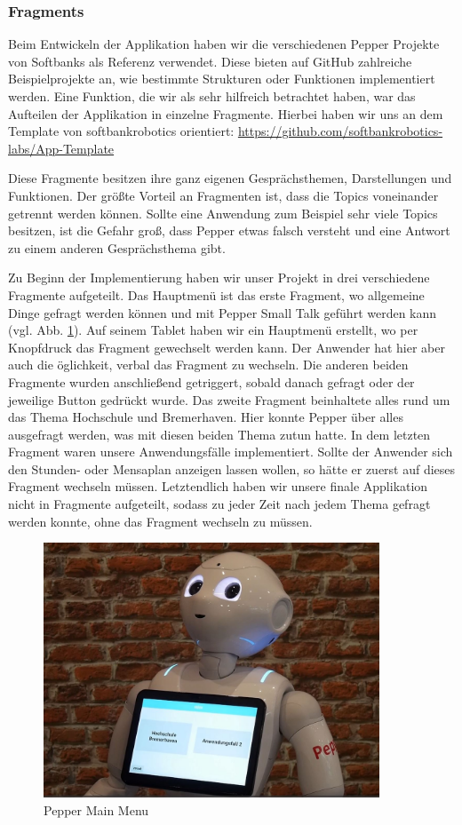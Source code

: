 \subsubsection{Fragments}

Beim Entwickeln der Applikation haben wir die verschiedenen Pepper Projekte von Softbanks als Referenz verwendet. Diese bieten auf GitHub zahlreiche Beispielprojekte an, wie bestimmte Strukturen oder Funktionen implementiert werden. Eine Funktion, die wir als sehr hilfreich betrachtet haben, war das Aufteilen der Applikation in einzelne Fragmente. Hierbei haben wir uns an dem Template von softbankrobotics orientiert: \url{https://github.com/softbankrobotics-labs/App-Template}

Diese Fragmente besitzen ihre ganz eigenen Gesprächsthemen, Darstellungen und Funktionen. Der größte Vorteil an Fragmenten ist, dass die Topics voneinander getrennt werden können. Sollte eine Anwendung zum Beispiel sehr viele Topics besitzen, ist die Gefahr groß, dass Pepper etwas falsch versteht und eine Antwort zu einem anderen Gesprächsthema gibt.

Zu Beginn der Implementierung haben wir unser Projekt in drei verschiedene Fragmente aufgeteilt. Das Hauptmenü ist das erste Fragment, wo allgemeine Dinge gefragt werden können und mit Pepper Small Talk geführt werden kann (vgl. Abb. \ref{fig:Mainmenu}). Auf seinem Tablet haben wir ein Hauptmenü erstellt, wo per Knopfdruck das Fragment gewechselt werden kann. Der Anwender hat hier aber auch die öglichkeit, verbal das Fragment zu wechseln. Die anderen beiden Fragmente wurden anschließend getriggert, sobald danach gefragt oder der jeweilige Button gedrückt wurde. Das zweite Fragment beinhaltete alles rund um das Thema Hochschule und Bremerhaven. Hier konnte Pepper über alles ausgefragt werden, was mit diesen beiden Thema zutun hatte. In dem letzten Fragment waren unsere Anwendungsfälle implementiert. Sollte der Anwender sich den Stunden- oder Mensaplan anzeigen lassen wollen, so hätte er zuerst auf dieses Fragment wechseln müssen. Letztendlich haben wir unsere finale Applikation nicht in Fragmente aufgeteilt, sodass zu jeder Zeit nach jedem Thema gefragt werden konnte, ohne das Fragment wechseln zu müssen.\\

\begin{figure}[H]
    \centering
    \includegraphics[width=10cm]{Figures/AppChapter/rx1.JPG}
    \caption{Pepper Main Menu}
    \label{fig:Mainmenu}
    \centering
\end{figure}

